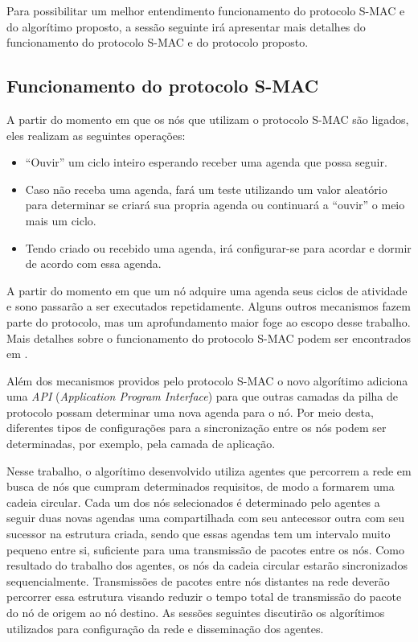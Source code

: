 Para possibilitar um melhor entendimento funcionamento do protocolo S-MAC e do algorítimo proposto, a sessão seguinte irá apresentar mais detalhes do funcionamento do protocolo S-MAC e do protocolo proposto.

\subsection{Funcionamento do protocolo S-MAC\cite{ye04}}

A partir do momento em que os nós que utilizam o protocolo S-MAC são ligados, eles realizam as seguintes operações:

\begin{itemize}
	\item ``Ouvir'' um ciclo inteiro esperando receber uma agenda que possa seguir.
	\item Caso não receba uma agenda, fará um teste utilizando um valor aleatório para determinar se criará sua propria agenda ou continuará a ``ouvir'' o meio mais um ciclo.
	\item Tendo criado ou recebido uma agenda, irá configurar-se para acordar e dormir de acordo com essa agenda.
\end{itemize}

A partir do momento em que um nó adquire uma agenda seus ciclos de atividade e sono passarão a ser executados repetidamente. Alguns outros mecanismos fazem parte do protocolo, mas um aprofundamento maior foge ao escopo desse trabalho. Mais detalhes sobre o funcionamento do protocolo S-MAC podem ser encontrados em \cite{ye04}. 

Além dos mecanismos providos pelo protocolo S-MAC o novo algorítimo adiciona uma \emph{API } (\emph{Application Program Interface}) para que outras camadas da pilha de protocolo possam determinar uma nova agenda para o nó. Por meio desta, diferentes tipos de configurações para a sincronização entre os nós podem ser determinadas, por exemplo, pela camada de aplicação.

Nesse trabalho, o algorítimo desenvolvido utiliza agentes que percorrem a rede em busca de nós que cumpram determinados requisitos, de modo a formarem uma cadeia circular. Cada um dos nós selecionados é determinado pelo agentes a seguir duas novas agendas uma compartilhada com seu antecessor outra com seu sucessor na estrutura criada, sendo que essas agendas tem um intervalo muito pequeno entre si, suficiente para uma transmissão de pacotes entre os nós. Como resultado do trabalho dos agentes, os nós da cadeia circular estarão sincronizados sequencialmente. Transmissões de pacotes entre nós distantes na rede deverão percorrer essa estrutura visando reduzir o tempo total de transmissão do pacote do nó de origem ao nó destino. As sessões seguintes discutirão os algorítimos utilizados para configuração da rede e disseminação dos agentes.

